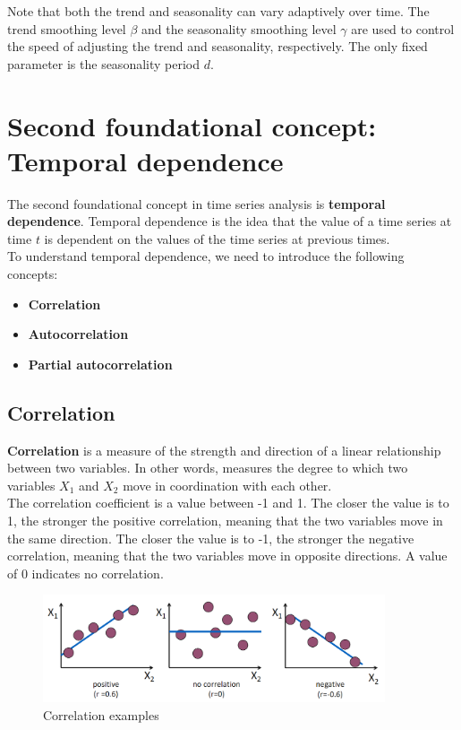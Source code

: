 Note that both the trend and seasonality can vary adaptively over time. The trend
smoothing level $\beta$ and the seasonality smoothing level $\gamma$ are used to
control the speed of adjusting the trend and seasonality, respectively. The only 
fixed parameter is the seasonality period $d$.

\section{Second foundational concept: Temporal dependence}

The second foundational concept in time series analysis is \textbf{temporal dependence}.
Temporal dependence is the idea that the value of a time series at time $t$ is
dependent on the values of the time series at previous times.\\

To understand temporal dependence, we need to introduce the following concepts:
\begin{itemize}
    \item \textbf{Correlation}
    \item \textbf{Autocorrelation}
    \item \textbf{Partial autocorrelation}
\end{itemize}

\subsection{Correlation}

\textbf{Correlation} is a measure of the strength and direction of a linear relationship
between two variables. In other words, measures the degree to which two variables
$X_1$ and $X_2$ move in coordination with each other.\\

The correlation coefficient is a value between -1 and 1. The closer the value is to
1, the stronger the positive correlation, meaning that the two variables move in the
same direction. The closer the value is to -1, the stronger the negative correlation,
meaning that the two variables move in opposite directions. A value of 0 indicates
no correlation.

\begin{figure}[H]
    \centering
    \includegraphics[width=0.9\textwidth]{figures/correlation.png}
    \caption{Correlation examples}
    \label{fig:correlation}
\end{figure}

